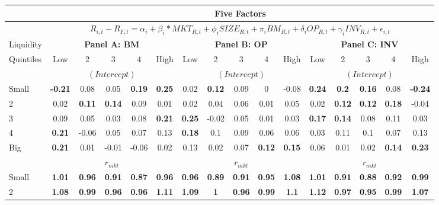 \begin{table}[H]
\tiny
\centering
\begin{tabular}{lccccc|ccccc|ccccc}
\hline
& \multicolumn{15}{c}{Five Factors} \\ \hline
& \multicolumn{15}{c}{\tiny $R_{i,t} - R_{F,t} = \alpha_i+\beta_i*MKT_{R,t} + \phi_iSIZE_{R,t}+\pi_iBM_{R,t} + \delta_iOP_{R,t}+\gamma_iINV_{R,t} + \epsilon_{i,t}$} \\ \hline
Liquidity & \multicolumn{5}{c|}{\textbf{Panel A: BM}} & \multicolumn{5}{c|}{\textbf{Panel B: OP}} & \multicolumn{5}{c}{\textbf{Panel C: INV}} \\
Quintiles & Low & 2 & 3 & 4 & High & Low & 2 & 3 & 4 & High & Low & 2 & 3 & 4 & High \\  \hline
 & \multicolumn{5}{c|}{$(Intercept)$} & \multicolumn{5}{c|}{$(Intercept)$} & \multicolumn{5}{c}{$(Intercept)$} \\
Small & \textbf{-0.21} & 0.08 & 0.05 & \textbf{0.19} & \textbf{0.25} & 0.02 & \textbf{0.12} & 0.09 & 0 & -0.08 & \textbf{0.24} & \textbf{0.2} & \textbf{0.16} & 0.08 & \textbf{-0.24} \\
2 & 0.02 & \textbf{0.11} & \textbf{0.14} & 0.09 & 0.01 & 0.02 & 0.04 & 0.06 & 0.01 & 0.05 & 0.02 & \textbf{0.12} & \textbf{0.12} & \textbf{0.18} & -0.04 \\
3 & 0.09 & 0.05 & 0.03 & 0.08 & \textbf{0.21} & \textbf{0.25} & -0.02 & 0.05 & 0.01 & 0.03 & \textbf{0.17} & \textbf{0.14} & 0.08 & 0.11 & 0.03 \\
4 & \textbf{0.21} & -0.06 & 0.05 & 0.07 & 0.13 & \textbf{0.18} & 0.1 & 0.09 & 0.06 & 0.06 & 0.03 & 0.11 & 0.1 & 0.07 & 0.13 \\
Big & \textbf{0.21} & 0.01 & -0.01 & -0.06 & 0.02 & 0.13 & 0.02 & 0.07 & \textbf{0.12} & \textbf{0.15} & 0.06 & 0.01 & 0.02 & \textbf{0.14} & \textbf{0.23} \\
 & \multicolumn{5}{c|}{$r_{mkt}$} & \multicolumn{5}{c|}{$r_{mkt}$} & \multicolumn{5}{c}{$r_{mkt}$} \\
Small & \textbf{1.01} & \textbf{0.96} & \textbf{0.91} & \textbf{0.87} & \textbf{0.96} & \textbf{0.96} & \textbf{0.89} & \textbf{0.91} & \textbf{0.95} & \textbf{1.08} & \textbf{1.01} & \textbf{0.91} & \textbf{0.88} & \textbf{0.92} & \textbf{0.99} \\
2 & \textbf{1.08} & \textbf{0.99} & \textbf{0.96} & \textbf{0.96} & \textbf{1.11} & \textbf{1.09} & \textbf{1} & \textbf{0.96} & \textbf{0.99} & \textbf{1.1} & \textbf{1.12} & \textbf{0.97} & \textbf{0.95} & \textbf{0.99} & \textbf{1.07} \\

\end{tabular}
\end{table}
